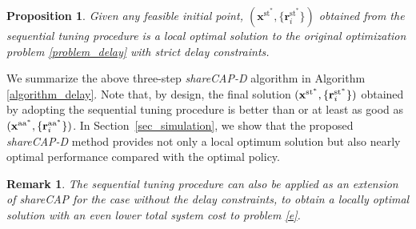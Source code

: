 \documentclass[10pt,journal,compsoc]{IEEEtran}
\newtheorem{Remark}{Remark}
\newtheorem{Prop}{Proposition}
\def\rbf{{\bf r}}
\def\xbf{{\bf x}}
\def\rbf{{\bf r}}
\def\xbf{{\bf x}}
\begin{document}
{\begin{Prop}\label{thm.ST} \it
Given any feasible initial point,
$(\mathbf{x}^{\text{st}^*},\{\mathbf{r}_i^{\text{st}^*}\})$ obtained
from the sequential tuning procedure is a local optimal solution to
the original optimization problem \eqref{problem_delay} with strict
delay constraints.
\end{Prop}


We summarize the above three-step \textit{shareCAP-D} algorithm in
Algorithm \ref{algorithm_delay}. Note that, by design, the final
solution $(\xbf^{\text{st}^*},\{\rbf^{\text{st}^*}_i\})$ obtained by
adopting the sequential tuning procedure is better than or at least
as good as $(\xbf^{\text{aa}^*},\{\rbf^{\text{aa}^*}_i\})$. In
Section~\ref{sec_simulation}, we show that the proposed
\textit{shareCAP-D} method provides not only a local optimum
solution but also nearly optimal performance compared with the
optimal policy.


\begin{Remark} \label{remark shareCAP}\it
The sequential tuning procedure can also be applied as an extension
of \textit{shareCAP} for the case without the delay constraints, to
obtain a locally optimal solution with an even lower total system
cost to problem \eqref{e}.
\end{Remark}

}
\end{document}
